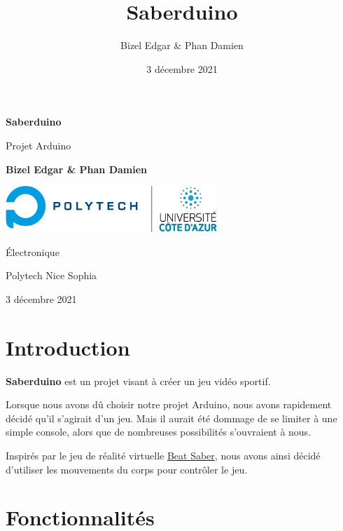 \documentclass[12pt,twoside]{article}
\title{Saberduino}
\author{Bizel Edgar \& Phan Damien}
\date{3 décembre 2021}
\begin{document}
\begin{titlepage}
	\begin{center}
		\vspace*{1cm}

		\Huge
		\textbf{Saberduino}

		\vspace{0.5cm}
		\LARGE
		Projet Arduino

		\vspace{1.5cm}

		\textbf{Bizel Edgar \& Phan Damien}

		\vfill

		\vspace{0.8cm}

		\includegraphics[width=0.6\textwidth]{logo_polytech.png}

		\vspace{0.8cm}

		\Large
		Électronique

		Polytech Nice Sophia

		3 décembre 2021

	\end{center}
\end{titlepage}

\tableofcontents

\newpage

\section{Introduction}%
\label{sec:introduction}

\textbf{Saberduino} est un projet visant à créer un jeu vidéo sportif.

Lorsque nous avons dû choisir notre projet Arduino, nous avons rapidement décidé qu'il
s'agirait d'un jeu. Mais il aurait été dommage de se limiter à une simple console, alors
que de nombreuses possibilités s'ouvraient à nous.

Inspirés par le jeu de réalité virtuelle \href{https://store.steampowered.com/app/620980/Beat_Saber}{Beat
Saber}, nous avons ainsi décidé d'utiliser les mouvements du corps pour contrôler le jeu.

\section{Fonctionnalités}%
\label{sec:fonctionnalites}
\end{document}
